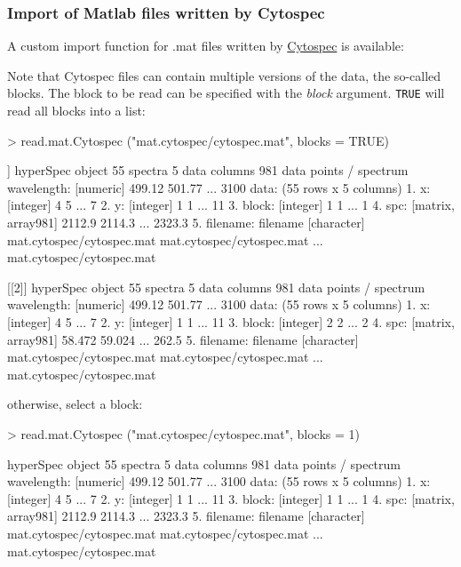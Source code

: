\documentclass[english, a4paper, 10pt, headings=small, DIV11]{scrartcl}
\renewenvironment{Schunk}{\vspace{0pt}\begin{small}}{\end{small}\vspace{0pt}}
\newcommand{\Rcode}[2][]{\texorpdfstring{\nohyphens{#1\texttt{#2}}}{#2}}
\newcommand{\Rfunarg}[1]{\texorpdfstring{\nohyphens{\textit{#1}}}{#1}}
\begin{document}
\subsubsection{Import of Matlab files written by Cytospec}
\label{sec:read.mat.Cytospec}

A custom import function for .mat files written by \href{www.cytospec.com}{Cytospec} is available:

Note that Cytospec files can contain multiple versions of the data, the so-called blocks. The block
to be read can be specified with the \Rfunarg{block} argument. \Rcode{TRUE} will read all blocks into
a list:

\begin{Schunk}
\begin{Sinput}
> read.mat.Cytospec ("mat.cytospec/cytospec.mat", blocks = TRUE)
\end{Sinput}
\begin{Soutput}
[[1]]
hyperSpec object
   55 spectra
   5 data columns
   981 data points / spectrum
wavelength:  [numeric] 499.12 501.77 ... 3100 
data:  (55 rows x 5 columns)
   1. x:  [integer] 4 5 ... 7 
   2. y:  [integer] 1 1 ... 11 
   3. block:  [integer] 1 1 ... 1 
   4. spc:  [matrix, array981] 2112.9 2114.3 ... 2323.3 
   5. filename: filename [character] mat.cytospec/cytospec.mat mat.cytospec/cytospec.mat ... mat.cytospec/cytospec.mat 

[[2]]
hyperSpec object
   55 spectra
   5 data columns
   981 data points / spectrum
wavelength:  [numeric] 499.12 501.77 ... 3100 
data:  (55 rows x 5 columns)
   1. x:  [integer] 4 5 ... 7 
   2. y:  [integer] 1 1 ... 11 
   3. block:  [integer] 2 2 ... 2 
   4. spc:  [matrix, array981] 58.472 59.024 ... 262.5 
   5. filename: filename [character] mat.cytospec/cytospec.mat mat.cytospec/cytospec.mat ... mat.cytospec/cytospec.mat 
\end{Soutput}
\end{Schunk}

otherwise, select a block:
\begin{Schunk}
\begin{Sinput}
> read.mat.Cytospec ("mat.cytospec/cytospec.mat", blocks = 1)
\end{Sinput}
\begin{Soutput}
hyperSpec object
   55 spectra
   5 data columns
   981 data points / spectrum
wavelength:  [numeric] 499.12 501.77 ... 3100 
data:  (55 rows x 5 columns)
   1. x:  [integer] 4 5 ... 7 
   2. y:  [integer] 1 1 ... 11 
   3. block:  [integer] 1 1 ... 1 
   4. spc:  [matrix, array981] 2112.9 2114.3 ... 2323.3 
   5. filename: filename [character] mat.cytospec/cytospec.mat mat.cytospec/cytospec.mat ... mat.cytospec/cytospec.mat 
\end{Soutput}
\end{Schunk}
\end{document}
